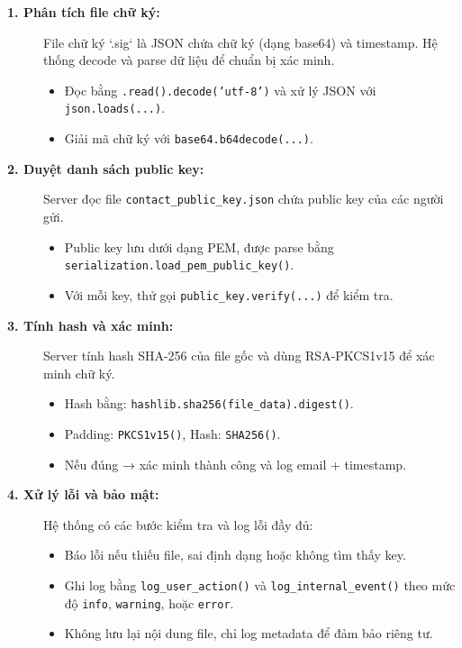 \begin{description}

    \item[\textbf{1. Phân tích file chữ ký:}]
    File chữ ký `.sig` là JSON chứa chữ ký (dạng base64) và timestamp. Hệ thống decode và parse dữ liệu để chuẩn bị xác minh.
    \begin{itemize}
        \item Đọc bằng \texttt{.read().decode('utf-8')} và xử lý JSON với \texttt{json.loads(...)}.
        \item Giải mã chữ ký với \texttt{base64.b64decode(...)}.
    \end{itemize}

    \item[\textbf{2. Duyệt danh sách public key:}]
    Server đọc file \texttt{contact\_public\_key.json} chứa public key của các người gửi.
    \begin{itemize}
        \item Public key lưu dưới dạng PEM, được parse bằng \texttt{serialization.load\_pem\_public\_key()}.
        \item Với mỗi key, thử gọi \texttt{public\_key.verify(...)} để kiểm tra.
    \end{itemize}

    \item[\textbf{3. Tính hash và xác minh:}]
    Server tính hash SHA-256 của file gốc và dùng RSA-PKCS1v15 để xác minh chữ ký.
    \begin{itemize}
        \item Hash bằng: \texttt{hashlib.sha256(file\_data).digest()}.
        \item Padding: \texttt{PKCS1v15()}, Hash: \texttt{SHA256()}.
        \item Nếu đúng → xác minh thành công và log email + timestamp.
    \end{itemize}

    \item[\textbf{4. Xử lý lỗi và bảo mật:}]
    Hệ thống có các bước kiểm tra và log lỗi đầy đủ:
    \begin{itemize}
        \item Báo lỗi nếu thiếu file, sai định dạng hoặc không tìm thấy key.
        \item Ghi log bằng \texttt{log\_user\_action()} và \texttt{log\_internal\_event()} theo mức độ \texttt{info}, \texttt{warning}, hoặc \texttt{error}.
        \item Không lưu lại nội dung file, chỉ log metadata để đảm bảo riêng tư.
    \end{itemize}


\end{description}
